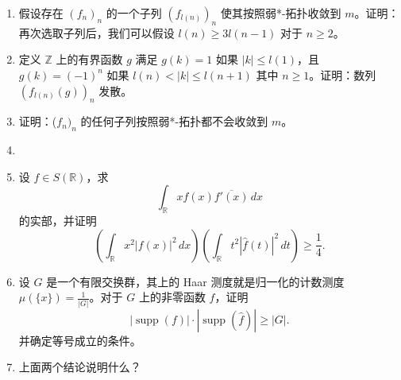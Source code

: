 \begin{enumerate}
    \item[(a)] 假设存在 $(f_n)_n$ 的一个子列 $(f_{l(n)})_n$ 使其按照弱*-拓扑收敛到 $m$。证明：再次选取子列后，我们可以假设 $ l(n) \geq 3l(n-1) $ 对于 $ n \geq 2 $。
    \item[(b)] 定义 $\mathbb{Z}$ 上的有界函数 $ g $ 满足 $ g(k) = 1 $ 如果 $ |k| \leq l(1) $，且 $ g(k) = (-1)^n $ 如果 $ l(n) < |k| \leq l(n+1) $ 其中 $ n \geq 1 $。证明：数列 $(f_{l(n)}(g))_n$ 发散。
    \item[(c)] 证明：($f_n)_n$ 的任何子列按照弱*-拓扑都不会收敛到 $m$。

    \item[六、]
    \item[(a)] 设 $ f \in S(\mathbb{R}) $，求
    \[
    \int_{\mathbb{R}} x f(x) \overline{f'(x)} \, dx
    \]
    的实部，并证明
    \[
    \left( \int_{\mathbb{R}} x^2 |f(x)|^2 \, dx \right) \left( \int_{\mathbb{R}} t^2 |\hat{f}(t)|^2 \, dt \right) \geq \frac{1}{4}.
    \]
    \item[(b)] 设 $ G $ 是一个有限交换群，其上的 Haar 测度就是归一化的计数测度 $\mu(\{x\}) = \frac{1}{|G|}$。对于 $ G $ 上的非零函数 $ f $，证明
    \[
    |\operatorname{supp}(f)| \cdot |\operatorname{supp}(\hat{f})| \geq |G|.
    \]
    并确定等号成立的条件。
    \item[(c)] 上面两个结论说明什么？


\end{enumerate}
